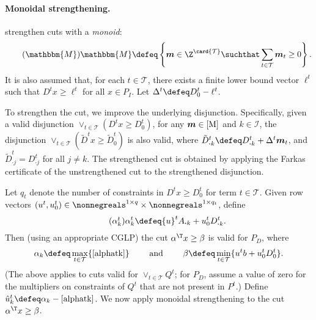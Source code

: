 \documentclass[oribibl,envcountsame]{llncs}
\theoremstyle{remark}
\theoremstyle{definition}
\renewcommand{\vec}[1]{\boldsymbol{#1}}
\newcommand{\intvars}{\mathcal{I}}
\newcommand{\PI}{P_{I}}
\newcommand{\PD}{P_{D}}
\newcommand{\disjTermsIndexSet}{\mathcal{T}}
\newcommand{\alphatk}{\ref{alphatk}}
\newcommand{\Deltat}{\Delta^t}
\newcommand{\monoidSet}{\mathbbm{M}}
\newcommand{\monoid}{\vec{m}}
\newcommand{\numRowsP}{q}
\newcommand{\numRowsDt}{q_t}
\newcommand{\mxcol}[2]{#1_{\boldsymbol{\cdot} #2}}
\begin{document}
\paragraph{Monoidal strengthening.}

\citet{BalJer80} strengthen cuts with a \emph{monoid}:
  \begin{equation}
  \label{M}
  \tag{\ensuremath{\monoidSet}}
    \monoidSet \defeq \left\{ \monoid \in \Z^{\card{\disjTermsIndexSet}} \suchthat \sum_{t \in \disjTermsIndexSet} \monoid_t \ge 0 \right\}.
  \end{equation}
It is also assumed that, 
for each $t \in \disjTermsIndexSet$,
there exists a finite lower bound vector $\ell^t$ such that $D^t x \ge \ell^t$ for all $x \in \PI$.
Let $\Deltat \defeq D^t_0 - \ell^t$.

To strengthen the cut, we improve the underlying disjunction.
Specifically, given a valid disjunction $\vee_{t \in \disjTermsIndexSet} (D^t x \ge D^t_0)$,
for any $\monoid \in \ref{M}$ and $k \in \intvars$,
the disjunction $\vee_{t \in \disjTermsIndexSet} (\tilde{D}^t x \ge \tilde{D}^t_0)$ is also valid,
where $\mxcol{\tilde{D}^t}{k} \defeq \mxcol{D^t}{k} + \Deltat \monoid_t$, 
and $\mxcol{\tilde{D}^t}{j} = \mxcol{D^t}{j}$ for all $j \ne k$.
The strengthened cut is obtained by applying the Farkas certificate of the unstrengthened cut to the strengthened disjunction.

Let $\numRowsDt$ denote the number of constraints in $D^t x \ge D^t_0$ for term $t \in \disjTermsIndexSet$.
Given row vectors
	$(u^t,u^t_0) \in \nonnegreals^{1 \times \numRowsP} \times \nonnegreals^{1 \times \numRowsDt}$,
define
	\begin{equation}
	\label{alphatk}
	\tag{\ensuremath{\alpha^t_k}}
	  \alpha^t_k \defeq {u}^t \mxcol{A}{k} + u^t_0 \mxcol{D^t}{k}.
	\end{equation}
Then (using an appropriate CGLP) the cut $\alpha^\T x \ge \beta$ is valid for $\PD$,
where
    \begin{equation*}
            \alpha_k \defeq \max_{t \in \disjTermsIndexSet} \{ \alphatk \}
            \qquad
            \text{ and }
            \qquad
            \beta \defeq \min_{t \in \disjTermsIndexSet} \{ u^t b + u^t_0 D^t_0 \}.
    \end{equation*}
(The above applies to cuts valid for $\vee_{t \in \disjTermsIndexSet} Q^t$; for $\PD$, assume a value of zero for the multipliers on constraints of $Q^t$ that are not present in $P^t$.)
Define $\hat{u}^t_k \defeq \alpha_k - \alphatk$.
We now apply monoidal strengthening to the cut $\alpha^\T x \ge \beta$.
	
\end{document}
